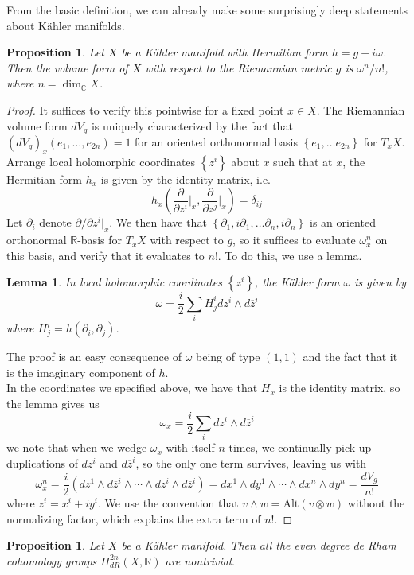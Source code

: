\documentclass[psamsfonts, 12pt]{amsart}
\newtheorem{prop}[thm]{Proposition}
\newtheorem{lem}[thm]{Lemma}
\theoremstyle{definition}
\theoremstyle{remark}
\newcommand{\R}{\mathbb{R}}
\newcommand{\C}{\mathbb{C}}
\newcommand{\zbar}{\overline{z}}
\newcommand{\set}[1]{\left\lbrace #1 \right\rbrace}
\begin{document}
From the basic definition, we can already make some surprisingly deep statements about
K\"ahler manifolds.
%
\begin{prop}
Let $X$ be a K\"ahler manifold with Hermitian form $h = g + i\omega$. Then the volume
form of $X$ with respect to the Riemannian metric $g$ is $\omega^n/n!$, where
$n = \dim_\C X$.
\end{prop}
%
\begin{proof}
It suffices to verify this pointwise for a fixed point $x \in X$.
The Riemannian volume form $dV_g$ is uniquely characterized by the fact that
$(dV_g)_x(e_1, \ldots, e_{2n}) = 1$ for an oriented orthonormal basis
$\set{e_1, \ldots e_{2n}}$ for $T_xX$. Arrange local holomorphic coordinates
$\set{z^i}$ about $x$ such that at $x$, the Hermitian form $h_x$ is given by the
identity matrix, i.e.
\[
h_x\left(\frac{\partial}{\partial z^i}\bigg\vert_x,
\frac{\partial}{\partial z^j}\bigg\vert_x\right) = \delta_{ij}
\]
Let $\partial_i$ denote $\partial/\partial z^i\vert_x$. We then have that
$\set{\partial_1, i\partial_1, \ldots \partial_n, i\partial_n}$ is an oriented
orthonormal $\R$-basis for $T_xX$ with respect to $g$, so it suffices to evaluate
$\omega^n_x$ on this basis, and verify that it evaluates to $n!$. To do this, we
use a lemma.
%
\begin{lem}
In local holomorphic coordinates $\set{z^i}$, the K\"ahler form $\omega$ is given by
\[
\omega = \frac{i}{2}\sum_i H^i_j dz^i \wedge d\zbar^i
\]
where $H^i_j = h(\partial_i, \partial_j)$.
\end{lem}
%
The proof is an easy consequence of $\omega$ being of type $(1,1)$ and the
fact that it is the imaginary component of $h$. \\

In the coordinates we specified above, we have that $H_x$ is the identity matrix,
so the lemma gives us
\[
\omega_x = \frac{i}{2}\sum_i dz^i \wedge d\zbar^i
\]
we note that when we wedge $\omega_x$ with itself $n$ times, we continually pick
up duplications of $dz^i$ and $d\zbar^i$, so the only one term survives, leaving us with
\[
\omega_x^n = \frac{i}{2}\left(dz^1 \wedge d\zbar^i \wedge \cdots \wedge
dz^i \wedge d\zbar^i\right) = dx^1 \wedge dy^1 \wedge \cdots \wedge dx^n \wedge dy^n
= \frac{dV_g}{n!}
\]
where $z^i = x^i + iy^i$. We use the convention that
$v \wedge w = \mathrm{Alt}(v\otimes w)$ without the normalizing factor, which explains
the extra term of $n!$.
%
\end{proof}
%
\begin{prop}
Let $X$ be a K\"ahler manifold. Then all the even degree de Rham cohomology groups
$H^{2n}_{dR}(X,\R)$ are nontrivial.
\end{prop}
\end{document}
